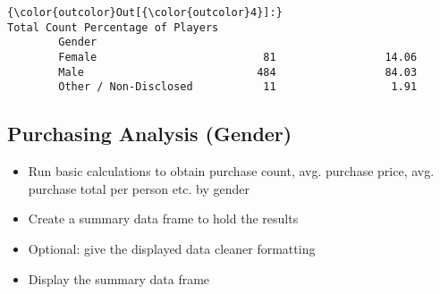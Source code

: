 \documentclass[11pt]{article}
\begin{document}
\begin{Verbatim}[commandchars=\\\{\}]
{\color{outcolor}Out[{\color{outcolor}4}]:}                        Total Count Percentage of Players
        Gender                                                  
        Female                          81                 14.06
        Male                           484                 84.03
        Other / Non-Disclosed           11                  1.91
\end{Verbatim}
            
    \subsection{Purchasing Analysis
(Gender)}\label{purchasing-analysis-gender}

    \begin{itemize}
\item
  Run basic calculations to obtain purchase count, avg. purchase price,
  avg. purchase total per person etc. by gender
\item
  Create a summary data frame to hold the results
\item
  Optional: give the displayed data cleaner formatting
\item
  Display the summary data frame
\end{itemize}
\end{document}
